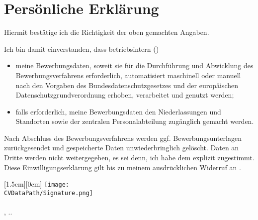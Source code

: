 \documentclass[a4paper,fontsize=12]{scrartcl}
\newcommand{\PrettyDate}{\number\day{}.\number\month{}.\number\year}
\newcommand{\MySignature}{%
	\parbox{\linewidth}{%
	\bigskip\hspace*{0.6cm}\raisebox{-0.4cm}[1.5cm][0cm]{%
		\texttt{[image: \\CVDataPath/Signature.png]}\\
	}\\
	\MyCity{}, \PrettyDate \\
	\MyNameFirst{} \MyNameLast
}}
\begin{document}
\newcommand{\PageFillImage}[1]{%
	\begin{minipage}[b]{\textwidth}
		\centering\fcolorbox{RoyalBlue}{white}{
			\texttt{[image: \\CVDataPath/\#1]}
		}
	\end{minipage}
	\newpage
}%

\CVDocs

\section{Persönliche Erklärung}

Hiermit bestätige ich die Richtigkeit der oben gemachten Angaben.

Ich bin damit einverstanden, dass betriebsintern (\RecpCompany)
\begin{itemize}\itemsep0em
\item meine Bewerbungsdaten, soweit sie für die Durchführung und Abwicklung des Bewerbungsverfahrens erforderlich, automatisiert maschinell oder manuell nach den Vorgaben des Bundesdatenschutzgesetzes und der europäischen Datenschutzgrundverordnung erhoben, verarbeitet und genutzt werden;
\item falls erforderlich, meine Bewerbungsdaten den Niederlassungen und Standorten sowie der zentralen Personalabteilung zugänglich gemacht werden.
\end{itemize}
Nach Abschluss des Bewerbungsverfahrens werden ggf. Bewerbungsunterlagen zurückgesendet und gespeicherte Daten unwiederbringlich gelöscht. Daten an Dritte werden nicht weitergegeben, es sei denn, ich habe dem explizit zugestimmt. Diese Einwilligungserklärung gilt bis zu meinem ausdrücklichen Widerruf an \RecpEmail.

\vfill
\MySignature
\vfill\vfill\vfill
\end{document}
